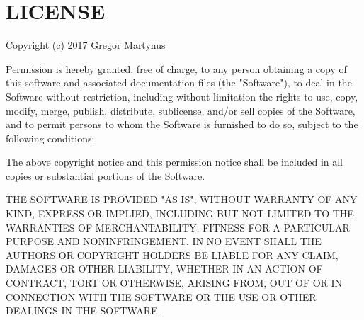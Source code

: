 \chapter{LICENSE}
\hypertarget{md_node__modules_2_0doctokit_2webhooks_2_l_i_c_e_n_s_e}{}\label{md_node__modules_2_0doctokit_2webhooks_2_l_i_c_e_n_s_e}
Copyright (c) 2017 Gregor Martynus

Permission is hereby granted, free of charge, to any person obtaining a copy of this software and associated documentation files (the "{}\+Software"{}), to deal in the Software without restriction, including without limitation the rights to use, copy, modify, merge, publish, distribute, sublicense, and/or sell copies of the Software, and to permit persons to whom the Software is furnished to do so, subject to the following conditions\+:

The above copyright notice and this permission notice shall be included in all copies or substantial portions of the Software.

THE SOFTWARE IS PROVIDED "{}\+AS IS"{}, WITHOUT WARRANTY OF ANY KIND, EXPRESS OR IMPLIED, INCLUDING BUT NOT LIMITED TO THE WARRANTIES OF MERCHANTABILITY, FITNESS FOR A PARTICULAR PURPOSE AND NONINFRINGEMENT. IN NO EVENT SHALL THE AUTHORS OR COPYRIGHT HOLDERS BE LIABLE FOR ANY CLAIM, DAMAGES OR OTHER LIABILITY, WHETHER IN AN ACTION OF CONTRACT, TORT OR OTHERWISE, ARISING FROM, OUT OF OR IN CONNECTION WITH THE SOFTWARE OR THE USE OR OTHER DEALINGS IN THE SOFTWARE. 